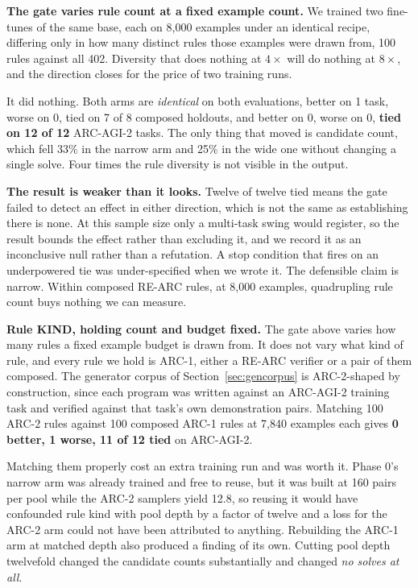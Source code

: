 \documentclass[11pt]{article}
\begin{document}
\textbf{The gate varies rule count at a fixed example count.} We trained two fine-tunes of the same base, each on 8{,}000
examples under an identical recipe, differing only in how many distinct rules those examples were drawn
from, 100 rules against all 402. Diversity that does nothing at $4\times$ will do nothing at $8\times$,
and the direction closes for the price of two training runs.

It did nothing. Both arms are \emph{identical} on both evaluations, better on 1 task, worse on 0, tied
on 7 of 8 composed holdouts, and better on 0, worse on 0, \textbf{tied on 12 of 12} ARC-AGI-2 tasks.
The only thing that moved is candidate count, which fell 33\% in the narrow arm and 25\% in the wide
one without changing a single solve. Four times the rule diversity is not visible in the output.

\textbf{The result is weaker than it looks.} Twelve of twelve tied means the gate failed to
detect an effect in either direction, which is not the same as establishing there is none. At this
sample size only a multi-task swing would register, so the result bounds the effect rather than
excluding it, and we record it as an inconclusive null rather than a refutation. A stop condition that
fires on an underpowered tie was under-specified when we wrote it. The defensible claim is narrow.
Within composed RE-ARC rules, at 8{,}000 examples, quadrupling rule count buys nothing we can measure.

\textbf{Rule KIND, holding count and budget fixed.} The gate above varies how many rules a fixed
example budget is drawn from. It does not vary what kind of rule, and every rule we hold is ARC-1, either a
RE-ARC verifier or a pair of them composed. The generator corpus of Section~\ref{sec:gencorpus} is
ARC-2-shaped by construction, since each program was written against an ARC-AGI-2 training task and
verified against that task's own demonstration pairs. Matching 100 ARC-2 rules against 100 composed
ARC-1 rules at 7{,}840 examples each gives \textbf{0 better, 1 worse, 11 of 12 tied} on ARC-AGI-2.

Matching them properly cost an extra training run and was worth it. Phase 0's narrow arm was already
trained and free to reuse, but it was built at 160 pairs per pool while the ARC-2 samplers yield 12.8,
so reusing it would have confounded rule kind with pool depth by a factor of twelve and a loss for the
ARC-2 arm could not have been attributed to anything. Rebuilding the ARC-1 arm at matched depth also
produced a finding of its own. Cutting pool depth twelvefold changed the candidate counts
substantially and changed \emph{no solves at all}.
\end{document}
